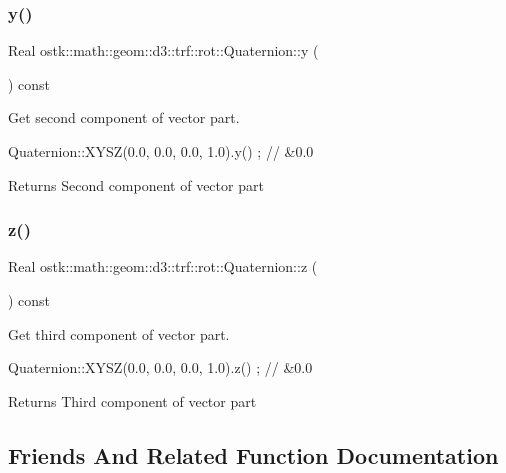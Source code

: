 \subsubsection{\texorpdfstring{y()}{y()}}
{\footnotesize\ttfamily Real ostk\+::math\+::geom\+::d3\+::trf\+::rot\+::\+Quaternion\+::y (\begin{DoxyParamCaption}{ }\end{DoxyParamCaption}) const}



Get second component of vector part. 


\begin{DoxyCode}
Quaternion::XYSZ(0.0, 0.0, 0.0, 1.0).y() ; \textcolor{comment}{// &0.0}
\end{DoxyCode}


\begin{DoxyReturn}{Returns}
Second component of vector part 
\end{DoxyReturn}
\mbox{\label{classostk_1_1math_1_1geom_1_1d3_1_1trf_1_1rot_1_1_quaternion_a0bb2ccff6bafbafc61232574584fb65d}} 
\subsubsection{\texorpdfstring{z()}{z()}}
{\footnotesize\ttfamily Real ostk\+::math\+::geom\+::d3\+::trf\+::rot\+::\+Quaternion\+::z (\begin{DoxyParamCaption}{ }\end{DoxyParamCaption}) const}



Get third component of vector part. 


\begin{DoxyCode}
Quaternion::XYSZ(0.0, 0.0, 0.0, 1.0).z() ; \textcolor{comment}{// &0.0}
\end{DoxyCode}


\begin{DoxyReturn}{Returns}
Third component of vector part 
\end{DoxyReturn}


\subsection{Friends And Related Function Documentation}
\mbox{\label{classostk_1_1math_1_1geom_1_1d3_1_1trf_1_1rot_1_1_quaternion_ab9414dc117f260055d0a1a565eb93708}} 
